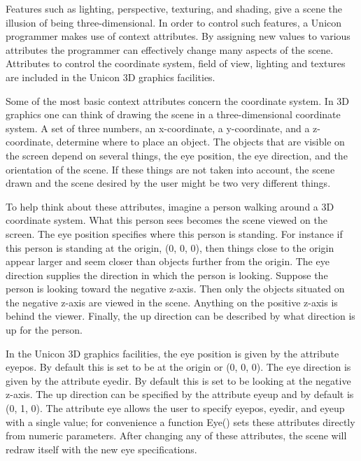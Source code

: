 \documentclass[letterpaper]{article}
\begin{document}
{
Features such as lighting, perspective, texturing, and shading, give a scene the illusion of being three-dimensional. In
order to control such features, a Unicon programmer makes use of context attributes. By assigning new values to various
attributes the programmer can effectively change many aspects of the scene. Attributes to control the coordinate
system, field of view, lighting and textures are included in the Unicon 3D graphics facilities. }

{
Some of the most basic context attributes concern the coordinate system. In 3D graphics one can think of drawing the
scene in a three-dimensional coordinate system. A set of three numbers, an x-coordinate, a y-coordinate, and a
z-coordinate, determine where to place an object. The objects that are visible on the screen depend on several things,
the eye position, the eye direction, and the orientation of the scene. If these things are not taken into account, the
scene drawn and the scene desired by the user might be two very different things. }

{
To help think about these attributes, imagine a person walking around a 3D coordinate system. What this person sees
becomes the scene viewed on the screen. The eye position specifies where this person is standing. For instance if this
person is standing at the origin, \textsf{(0, 0, 0),} then things close to the origin appear larger and seem closer
than objects further from the origin. The eye direction supplies the direction in which the person is looking. Suppose
the person is looking toward the negative z-axis. Then only the objects situated on the negative z-axis are viewed in
the scene. Anything on the positive z-axis is behind the viewer. Finally, the up direction can be described by what
direction is up for the person. }

{
In the Unicon 3D graphics facilities, the eye position is given by the attribute \textsf{eyepos}. By default this is set
to be at the origin or \textsf{(0, 0, 0)}. The eye direction is given by the attribute \textsf{eyedir}. By default this
is set to be looking at the negative z-axis. The up direction can be specified by the attribute \textsf{eyeup} and by
default is \textsf{(0, 1, 0)}. The attribute \textsf{eye} allows the user to specify \textsf{eyepos}, \textsf{eyedir},
and \textsf{eyeup} with a single value; for convenience a function \textsf{Eye()} sets these attributes directly from
numeric parameters. After changing any of these attributes, the scene will redraw itself with the new eye
specifications.}
\end{document}
